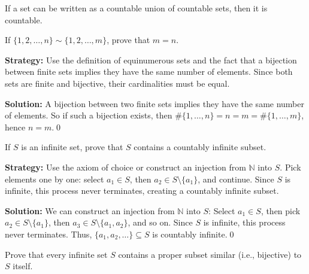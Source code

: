 \begin{theorem}
If a set can be written as a countable union of countable sets, then it is countable.
\end{theorem}



\begin{problembox}
\begin{problemstatement}
If \( \{1, 2, \ldots, n\} \sim \{1, 2, \ldots, m\} \), prove that \( m = n \).
\end{problemstatement}
\end{problembox}

\noindent\textbf{Strategy:} Use the definition of equinumerous sets and the fact that a bijection between finite sets implies they have the same number of elements. Since both sets are finite and bijective, their cardinalities must be equal.

\noindent\bigskip\noindent\textbf{Solution:}  
A bijection between two finite sets implies they have the same number of elements.  
So if such a bijection exists, then $\#\{1, \ldots, n\} = n = m = \#\{1, \ldots, m\}$, hence $n = m$.\qed



\begin{problembox}
\begin{problemstatement}
If \( S \) is an infinite set, prove that \( S \) contains a countably infinite subset.
\end{problemstatement}
\end{problembox}

\noindent\textbf{Strategy:} Use the axiom of choice or construct an injection from $\mathbb{N}$ into $S$. Pick elements one by one: select $a_1 \in S$, then $a_2 \in S \setminus \{a_1\}$, and continue. Since $S$ is infinite, this process never terminates, creating a countably infinite subset.

\noindent\bigskip\noindent\textbf{Solution:}  
We can construct an injection from \( \mathbb{N} \) into \( S \):  
Select \( a_1 \in S \), then pick \( a_2 \in S \setminus \{a_1\} \), then \( a_3 \in S \setminus \{a_1, a_2\} \), and so on.  
Since \( S \) is infinite, this process never terminates. Thus, $\{a_1, a_2, \ldots\} \subseteq S$ is countably infinite.\qed



\begin{problembox}
\begin{problemstatement}
Prove that every infinite set \( S \) contains a proper subset similar (i.e., bijective) to \( S \) itself.
\end{problemstatement}
\end{problembox}

